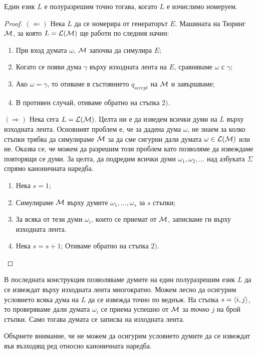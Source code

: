 \begin{framed}
  \begin{thm}
    Един език $L$ е полуразрешим точно тогава, когато $L$ е изчислимо номеруем.
  \end{thm}
\end{framed}
\begin{proof}
  $(\Leftarrow)$ Нека $L$ да се номерира от генераторът $E$.
  Машината на Тюринг $\mathcal{M}$, за която $L = \mathcal{L}(\mathcal{M})$ ще работи по следния начин:
  \begin{enumerate}[1)]
  \item 
    При вход думата $\omega$, $\mathcal{M}$ започва да симулира $E$;
  \item
    Когато се появи дума $\gamma$ върху изходната лента на $E$, сравняваме $\omega$ с $\gamma$;
  \item
    Ако $\omega = \gamma$, то отиваме в състоянието $q_{accept}$ на $\mathcal{M}$ и завършваме;
  \item
    В противен случай, отиваме обратно на стъпка $2)$.
  \end{enumerate}

  $(\Rightarrow)$ Нека сега $L = \mathcal{L}(\mathcal{M})$. Целта ни е да изведем всички думи на $L$ върху изходната лента.
  Основният проблем е, че за дадена дума $\omega$, не знаем за колко стъпки трябва да симулираме $\mathcal{M}$ за да сме сигурни дали думата $\omega \in \mathcal{L}(\mathcal{M})$ или не. Оказва се, че можем да разрешим този проблем като позволяме да извеждаме повторящи се думи.
  За целта, да подредим всички думи $\omega_1, \omega_2, \dots $ над азбуката $\Sigma$ спрямо каноничната наредба.
  \begin{enumerate}[1)]
  \item
    Нека $s = 1$;
  \item 
    Симулираме $\mathcal{M}$ върху думите $\omega_1,\dots,\omega_s$ за $s$ стъпки;
  \item
    За всяка от тези думи $\omega_i$, които се приемат от $\mathcal{M}$, записваме ги върху изходната лента.
  \item
    Нека $s = s+1$; Отиваме обратно на стъпка $2)$.
  \end{enumerate}
\end{proof}

\begin{remark}
  В последната конструкция позволяваме думите на един полуразрешим език $L$ да се 
  извеждат върху изходната лента многократно. Можем лесно да осигурим условието всяка дума на $L$
  да се извежда точно по веднъж.
  На стъпка $s = \langle{i,j}\rangle$, то проверяваме дали думата $\omega_i$ се приема успешно от $\mathcal{M}$
  за {\em точно} $j$ на брой стъпки. Само тогава думата се записва на изходната лента.
  
  Обърнете внимание, че не можем да осигурим условието думите да се извеждат във възходящ ред
  относно каноничната наредба.
\end{remark}

